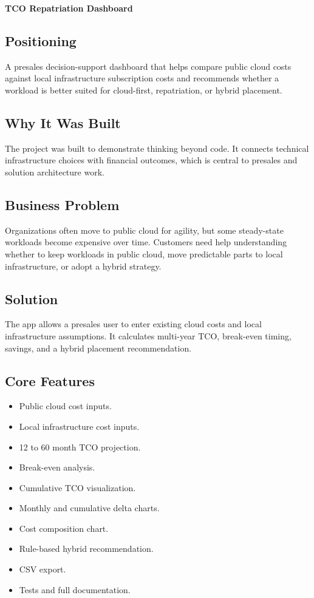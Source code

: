 \documentclass[11pt,a4paper]{article}
\begin{document}
\textbf{TCO Repatriation Dashboard}

\subsection{Positioning}

A presales decision-support dashboard that helps compare public cloud costs against local infrastructure subscription costs and recommends whether a workload is better suited for cloud-first, repatriation, or hybrid placement.

\subsection{Why It Was Built}

The project was built to demonstrate thinking beyond code. It connects technical infrastructure choices with financial outcomes, which is central to presales and solution architecture work.

\subsection{Business Problem}

Organizations often move to public cloud for agility, but some steady-state workloads become expensive over time. Customers need help understanding whether to keep workloads in public cloud, move predictable parts to local infrastructure, or adopt a hybrid strategy.

\subsection{Solution}

The app allows a presales user to enter existing cloud costs and local infrastructure assumptions. It calculates multi-year TCO, break-even timing, savings, and a hybrid placement recommendation.

\subsection{Core Features}

\begin{itemize}
  \item Public cloud cost inputs.
  \item Local infrastructure cost inputs.
  \item 12 to 60 month TCO projection.
  \item Break-even analysis.
  \item Cumulative TCO visualization.
  \item Monthly and cumulative delta charts.
  \item Cost composition chart.
  \item Rule-based hybrid recommendation.
  \item CSV export.
  \item Tests and full documentation.
\end{itemize}
\end{document}
